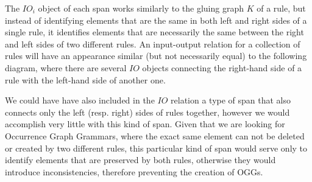 The $IO_i$ object of each span works similarly to the gluing graph $K$ of a rule, but instead of identifying elements that are the same in both left and right sides of a single rule, it identifies elements that are necessarily the same between the right and left sides of two different rules. An input-output relation for a collection of rules will have an appearance similar (but not necessarily equal) to the following diagram, where there are several $IO$ objects connecting the right-hand side of a rule with the left-hand side of another one.



\begin{remark}We could have have also included in the $IO$ relation a type of span that also connects only the left (resp. right) sides of rules together, however we would accomplish very little with this kind of span. Given that we are looking for Occurrence Graph Grammars, where the exact same element can not be deleted or created by two different rules, this particular kind of span would serve only to identify elements that are preserved by both rules, otherwise they would introduce inconsistencies, therefore preventing the creation of OGGs.
\end{remark}

